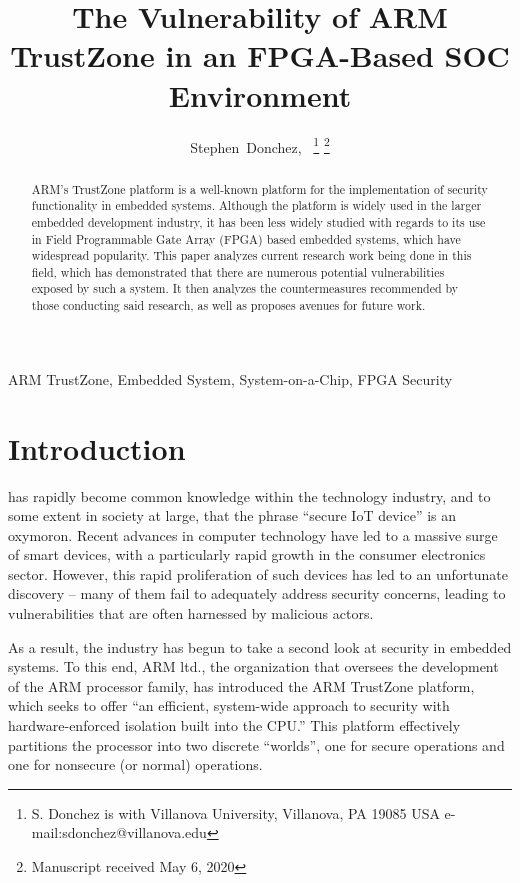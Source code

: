 \documentclass[journal]{IEEEtran}
\begin{document}
\title{The Vulnerability of ARM TrustZone in an FPGA-Based SOC Environment}

\author{Stephen~Donchez,~%
\thanks{S. Donchez is with Villanova University, Villanova, PA 19085 USA 
\mbox{e-mail:sdonchez@villanova.edu}}%
\thanks{Manuscript received May 6, 2020}}%

\maketitle

\begin{abstract}
ARM's TrustZone platform is a well-known platform for the implementation of security
functionality in embedded systems. Although the platform is widely used in the larger
embedded development industry, it has been less widely studied with regards to its use in
Field Programmable Gate Array (FPGA) based embedded systems, which have widespread
popularity. This paper analyzes current research work being done in this field, which has 
demonstrated that there are numerous potential vulnerabilities exposed by such a system.
It then analyzes the countermeasures recommended by those conducting said research, as
well as proposes avenues for future work.
\end{abstract}

\begin{IEEEkeywords}
ARM TrustZone, Embedded System, System-on-a-Chip, FPGA Security
\end{IEEEkeywords}

\section{Introduction}
 has rapidly become common knowledge within the technology industry, 
and to some extent in society at large, that the phrase “secure IoT device” is an oxymoron. 
Recent advances in computer technology have led to a massive surge of smart devices, with 
a particularly rapid growth in the consumer electronics sector. However, this rapid 
proliferation of such devices has led to an unfortunate discovery – many of them fail to 
adequately address security concerns, leading to vulnerabilities that are often harnessed 
by malicious actors.

As a result, the industry has begun to take a second look at security in embedded systems.
To this end, ARM ltd., the organization that oversees the development of the ARM processor
family, has introduced the ARM TrustZone platform, which seeks to offer ``an efficient, 
system-wide approach to security with hardware-enforced isolation built into the CPU.''
\cite{noauthor_trustzone_nodate} This platform effectively partitions the processor into
two discrete ``worlds'', one for secure operations and one for nonsecure (or normal) 
operations.
\end{document}
